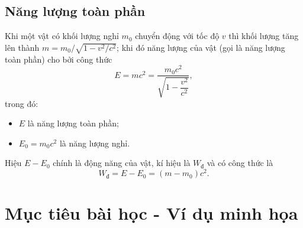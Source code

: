 	\subsection{Năng lượng toàn phần}
		Khi một vật có khối lượng nghỉ $m_0$ chuyển động với tốc độ $v$ thì khối lượng tăng lên thành $m={m_0}/{\sqrt{1-{v^2}/{c^2}}}$; khi đó năng lượng của vật (gọi là năng lượng toàn phần) cho bởi công thức
		\begin{equation}
		E=mc^2=\dfrac{m_0c^2}{\sqrt{1-\dfrac{v^2}{c^2}}},
		\end{equation}
		trong đó:
		\begin{itemize}
			\item $E$ là năng lượng toàn phần;
			\item $E_0=m_0c^2$ là năng lượng nghỉ.
		\end{itemize}
		
		Hiệu $E-E_0$ chính là động năng của vật, kí hiệu là $W_\text{đ}$ và có công thức là
		\begin{equation}
		W_\text{đ}=E-E_0=(m-m_0)c^2.
		\end{equation}
		
\section{Mục tiêu bài học - Ví dụ minh họa}
				
